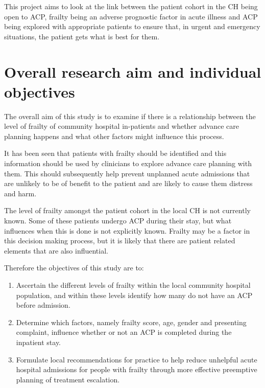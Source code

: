 \documentclass
[
	12pt,
	a4paper,
	oneside,
]{report}
\begin{document}
This project aims to look at the link between the patient cohort in the CH
being open to ACP, frailty being an adverse prognostic factor in acute illness 
and
ACP being explored with appropriate patients to ensure that, in urgent and 
emergency situations, the patient gets what is best for them.

\section{Overall research aim and individual objectives}

The overall aim of this study is to examine if there is a relationship 
between the 
level of frailty of community hospital in-patients and whether advance care planning
happens and what other factors might influence this process.

It has been seen that patients with frailty should be identified and this 
information should be used by clinicians to explore advance care planning with 
them.
This should subsequently help prevent unplanned acute admissions that are 
unlikely to be of benefit to the patient and are likely to cause them distress 
and harm.

The level of frailty amongst the patient cohort in the local CH is not currently
known. Some of these patients undergo ACP during their stay, but what 
influences when this is done is not explicitly known. Frailty may be a factor
in this decision making process, but it is likely that there are patient 
related elements that are also influential.

Therefore the objectives of this study are to:
\begin{enumerate}
\item	Ascertain the different levels of frailty within the local 
		community hospital population, and within these levels identify 
		how many do not have an ACP before admission.\label{obj:prevalence}
\item	Determine which factors, namely frailty score, age, gender and
		presenting complaint, influence whether or not an ACP is 
		completed during the inpatient stay.\label{obj:association}
\item	Formulate local recommendations for practice to help reduce unhelpful
		acute hospital admissions for people with frailty through more 
		effective preemptive planning of treatment escalation.
		\label{obj:recommend}
\end{enumerate}
\end{document}
